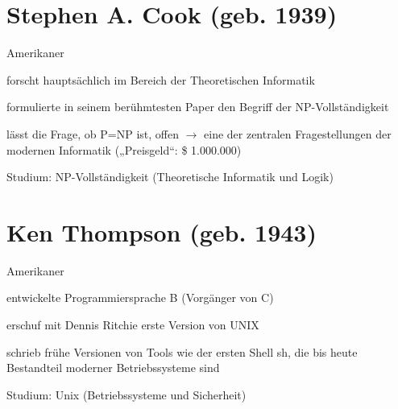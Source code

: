 \documentclass[a4paper,12pt]{report}
\begin{document}
\section*{Stephen A. Cook (geb. 1939)}
\begin{itemize*}
    \item Amerikaner
    \item forscht hauptsächlich im Bereich der Theoretischen Informatik
    \item formulierte in seinem berühmtesten Paper den Begriff der NP-Vollständigkeit
    \item lässt die Frage, ob P=NP ist, offen $\rightarrow$ eine der zentralen Fragestellungen
          der modernen Informatik („Preisgeld“: \$ 1.000.000)
    \item Studium: NP-Vollständigkeit (Theoretische Informatik und Logik)
\end{itemize*}

\section*{Ken Thompson (geb. 1943)}
\begin{itemize*}
    \item Amerikaner
    \item entwickelte Programmiersprache B (Vorgänger von C)
    \item erschuf mit Dennis Ritchie erste Version von UNIX
    \item schrieb frühe Versionen von Tools wie der ersten Shell sh, die bis heute Bestandteil
          moderner Betriebssysteme sind
    \item Studium: Unix (Betriebssysteme und Sicherheit)
\end{itemize*}


\end{document}
